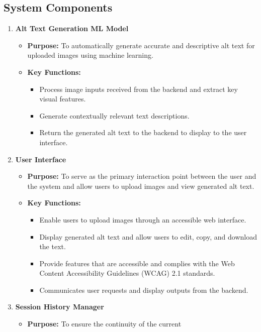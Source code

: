 \documentclass{article}
\begin{document}
\subsection{System Components}
\begin{enumerate}
  \item \textbf{Alt Text Generation ML Model}
    \begin{itemize}
      \item \textbf{Purpose:} To automatically generate accurate and
        descriptive alt text for uploaded images using machine learning.
      \item \textbf{Key Functions:}
        \begin{itemize}
          \item Process image inputs received from the backend and
            extract key visual features.
          \item Generate contextually relevant text descriptions.
          \item Return the generated alt text to the backend
            to display to the user interface.
        \end{itemize}
    \end{itemize}
  \item \textbf{User Interface}
    \begin{itemize}
      \item \textbf{Purpose:} To serve as the primary interaction
        point between the user and the system and allow users to
        upload images and view generated alt text.
      \item \textbf{Key Functions:}
        \begin{itemize}
          \item Enable users to upload images through an accessible
            web interface.
          \item Display generated alt text and allow users to edit,
            copy, and download the text.
          \item Provide features that are accessible and complies
            with the Web Content Accessibility Guidelines (WCAG) 2.1 standards.
          \item Communicates user requests and display outputs from the backend.
        \end{itemize}
    \end{itemize}
  \item \textbf{Session History Manager}
    \begin{itemize}
      \item \textbf{Purpose:} To ensure the continuity of the current

\end{itemize}
\end{enumerate}
\end{document}
